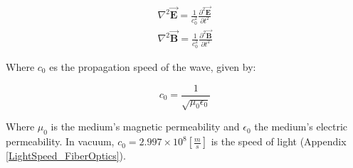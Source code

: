 \begin{eqnarray}
    \nabla^2 \overrightarrow{\textbf{E}} = \frac{1}{c_0^2}\frac{\partial^2 \overrightarrow{\textbf{E}}}{\partial t^2} \\
    \nabla^2 \overrightarrow{\textbf{B}} = \frac{1}{c_0^2}\frac{\partial^2 \overrightarrow{\textbf{B}}}{\partial t^2}
\end{eqnarray}

Where $c_0$ es the propagation speed of the wave, given by:

\begin{equation}
    c_0 = \frac{1}{\sqrt{\mu_0 \epsilon_0}}
\end{equation}

Where $\mu_0$ is the medium's magnetic permeability and $\epsilon_0$ the medium's electric permeability. In vacuum, $c_0 = 2.997 \times 10^8 [\frac{m}{s}]$ is the speed of light (Appendix \ref{LightSpeed_FiberOptics}).